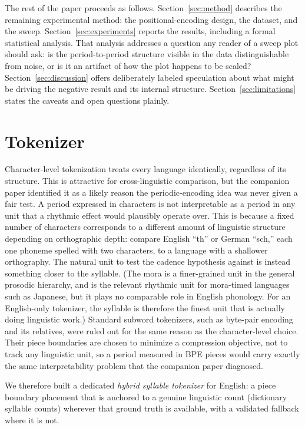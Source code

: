 \documentclass[11pt]{article}
\begin{document}
The rest of the paper proceeds as follows. Section~\ref{sec:method} describes the remaining experimental method: the positional-encoding design, the dataset, and the sweep. Section~\ref{sec:experiments} reports the results, including a formal statistical analysis. That analysis addresses a question any reader of a sweep plot should ask: is the period-to-period structure visible in the data distinguishable from noise, or is it an artifact of how the plot happens to be scaled? Section~\ref{sec:discussion} offers deliberately labeled speculation about what might be driving the negative result and its internal structure. Section~\ref{sec:limitations} states the caveats and open questions plainly.

\section{Tokenizer}
\label{sec:tokenizer}

Character-level tokenization treats every language identically, regardless of its structure. This is attractive for cross-linguistic comparison, but the companion paper identified it as a likely reason the periodic-encoding idea was never given a fair test. A period expressed in characters is not interpretable as a period in any unit that a rhythmic effect would plausibly operate over. This is because a fixed number of characters corresponds to a different amount of linguistic structure depending on orthographic depth: compare English ``th'' or German ``sch,'' each one phoneme spelled with two characters, to a language with a shallower orthography. The natural unit to test the cadence hypothesis against is instead something closer to the syllable. (The mora is a finer-grained unit in the general prosodic hierarchy, and is the relevant rhythmic unit for mora-timed languages such as Japanese, but it plays no comparable role in English phonology. For an English-only tokenizer, the syllable is therefore the finest unit that is actually doing linguistic work.) Standard subword tokenizers, such as byte-pair encoding and its relatives, were ruled out for the same reason as the character-level choice. Their piece boundaries are chosen to minimize a compression objective, not to track any linguistic unit, so a period measured in BPE pieces would carry exactly the same interpretability problem that the companion paper diagnosed.

We therefore built a dedicated \emph{hybrid syllable tokenizer} for English: a piece boundary placement that is anchored to a genuine linguistic count (dictionary syllable counts) wherever that ground truth is available, with a validated fallback where it is not.
\end{document}
